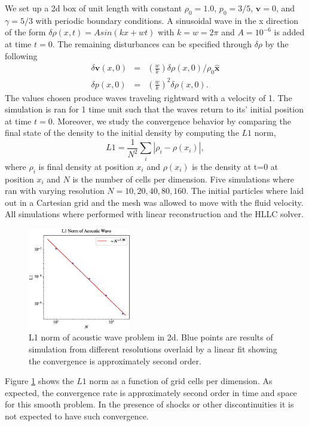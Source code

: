 We set up a 2d box of unit length with constant $\rho_0=1.0$, $p_0=3/5$, $\mathbf{v}=0$,
and $\gamma=5/3$ with periodic boundary conditions. A sinusoidal wave in the x direction of 
the form $\delta\rho(x,t) = Asin(kx + wt)$ with $k=w=2\pi$ and $A=10^{-6}$ is added at time 
$t=0$. The remaining disturbances can be specified through $\delta\rho$ by the following
\begin{equation}
	\begin{array}{rcl}
        \delta \mathbf{v}(x,0) & = & \left(\frac{w}{k}\right)\delta
        	\rho(x,0)/\rho_0\mathbf{\hat{x}}\\
        \delta p(x,0) & = & \left(\frac{w}{k}\right)^2\delta\rho(x,0).
    \end{array}
\end{equation}
The values chosen produce waves traveling rightward with a velocity of 1. The simulation is
ran for 1 time unit such that the waves return to its' initial position at time $t=0$. 
Moreover, we study the convergence behavior by comparing the final state of the density to 
the initial density by computing the $L1$ norm,
\begin{equation}
	L1 = \frac{1}{N^2}\sum_i \left| \rho_i - \rho(x_i) \right|,
\end{equation}
where $\rho_i$ is final density at position $x_i$ and $\rho(x_i)$ is the density at t=0
at position $x_i$ and $N$ is the number of cells per dimension. Five simulations where ran
with varying resolution $N=10, 20, 40, 80, 160$. The initial particles where laid out in a
Cartesian grid and the mesh was allowed to move with the fluid velocity. All simulations
where performed with linear reconstruction and the HLLC solver.
\begin{figure}
    \begin{center}
        \includegraphics[width=0.4\textwidth]{figures/acoustic-wave-l1.eps}
        \caption{L1 norm of acoustic wave problem in 2d. Blue points are results
        of simulation from different resolutions overlaid by a linear fit showing
        the convergence is approximately second order.}
        \label{fig.acoustic}
    \end{center}
\end{figure}
Figure \ref{fig.acoustic} shows the $L1$ norm as a function of grid cells per dimension.
As expected, the convergence rate is approximately second order in time and space for
this smooth problem. In the presence of shocks or other discontinuities it is not expected
to have such convergence.

